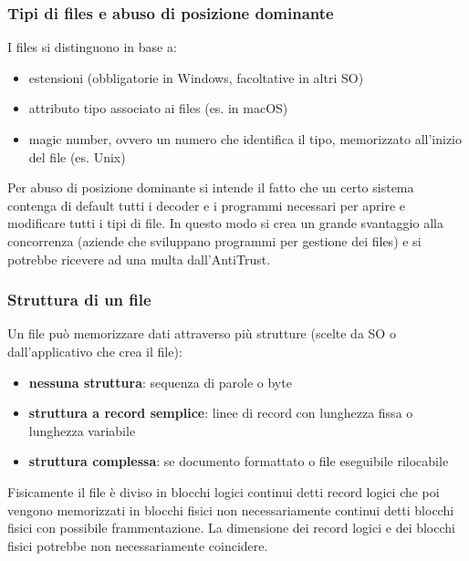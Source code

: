 \documentclass[a4paper]{article}
\begin{document}
\subsubsection*{Tipi di files e abuso di posizione dominante}
I files si distinguono in base a:
\begin{itemize}
	\item estensioni (obbligatorie in Windows, facoltative in altri SO)
	\item attributo tipo associato ai files (es. in macOS)
	\item magic number, ovvero un numero che identifica il tipo, memorizzato all'inizio del file (es. Unix)
\end{itemize}
Per abuso di posizione dominante si intende il fatto che un certo sistema contenga di default tutti i decoder e i programmi
necessari per aprire e modificare tutti i tipi di file. In questo modo si crea un grande svantaggio alla concorrenza (aziende
che sviluppano programmi per gestione dei files) e si potrebbe ricevere ad una multa dall'AntiTrust.

\subsubsection*{Struttura di un file}
Un file può memorizzare dati attraverso più strutture (scelte da SO o dall'applicativo che crea il file):
\begin{itemize}
	\item \textbf{nessuna struttura}: sequenza di parole o byte
	\item \textbf{struttura a record semplice}: linee di record con lunghezza fissa o lunghezza variabile
	\item \textbf{struttura complessa}: se documento formattato o file eseguibile rilocabile
\end{itemize}
Fisicamente il file è diviso in blocchi logici continui detti record logici che poi vengono memorizzati in blocchi fisici non
necessariamente continui detti blocchi fisici con possibile frammentazione. La dimensione dei record logici e dei blocchi fisici
potrebbe non necessariamente coincidere.
\end{document}
